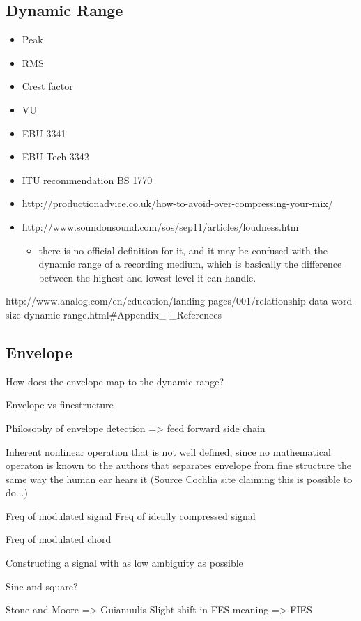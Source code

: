 \documentclass[../main2.tex]{subfiles}
\begin{document}
\subsection{Dynamic Range}
\begin{itemize}
\item Peak
\item RMS
\item Crest factor
\item VU
\item EBU 3341 
\item EBU Tech 3342
\item ITU recommendation BS 1770
\item http://productionadvice.co.uk/how-to-avoid-over-compressing-your-mix/
\item http://www.soundonsound.com/sos/sep11/articles/loudness.htm
\begin{itemize}
\item there is no official definition for it, and it may be confused with the dynamic range of a recording medium, which is basically the difference between the highest and lowest level it can handle.
\end{itemize}
\end{itemize}

http://www.analog.com/en/education/landing-pages/001/relationship-data-word-size-dynamic-range.html#Appendix_-_References


\subsection{Envelope}
How does the envelope map to the dynamic range?

Envelope vs finestructure

Philosophy of envelope detection => feed forward side chain

Inherent nonlinear operation that is not well defined, since no mathematical operaton is known to the authors that separates envelope from fine structure the same way the human ear hears it (Source Cochlia site claiming this is possible to do...)

Freq of modulated signal
Freq of ideally compressed signal

Freq of modulated chord

Constructing a signal with as low ambiguity as possible

Sine and square?

Stone and Moore => Guianuulis
Slight shift in FES meaning => FIES
\end{document}
